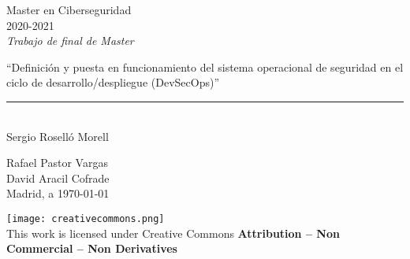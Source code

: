 \begin{titlepage}
	\begin{sffamily}
  \begin{figure}%
    \raggedleft
    \hspace*{\fill}
\end{figure}
	\begin{center}
		\vspace{2.5cm}
		\begin{Large}
			Master en Ciberseguridad\\			
			 2020-2021\\
			\vspace{2cm}		
			\textsl{Trabajo de final de Master}
			\bigskip
			
		\end{Large}
		 	{\Huge ``Definición y puesta en funcionamiento del sistema operacional de seguridad en el ciclo de desarrollo/despliegue (DevSecOps)''}\\
		 	\vspace*{0.5cm}
	 		\rule{10.5cm}{0.1mm}\\
			\vspace*{0.9cm}
			{\LARGE Sergio Roselló Morell}\\ 
			\vspace*{1cm}
		\begin{Large}
			Rafael Pastor Vargas\\
			David Aracil Cofrade\\
			Madrid, a \today \\
		\end{Large}
	\end{center}
	\vfill
	\color{black}

	\noindent\texttt{[image: creativecommons.png]}\\ %
    \footnotesize{This work is licensed under Creative Commons \textbf{Attribution – Non Commercial – Non Derivatives}}
	
	\end{sffamily}
\end{titlepage}

\newpage %
\thispagestyle{empty}
\mbox{}


